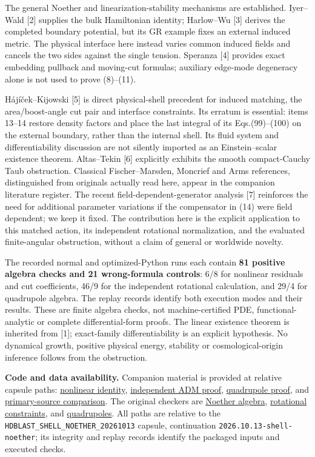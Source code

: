 \documentclass[
  10pt,
]{article}
\begin{document}
The general Noether and linearization-stability mechanisms are
established. Iyer--Wald {[}2{]} supplies the bulk Hamiltonian identity;
Harlow--Wu {[}3{]} derives the completed boundary potential, but its GR
example fixes an external induced metric. The physical interface here
instead varies common induced fields and cancels the two sides against
the single tension. Speranza {[}4{]} provides exact embedding pullback
and moving-cut formulas; auxiliary edge-mode degeneracy alone is not
used to prove (8)--(11).

Hájíček--Kijowski {[}5{]} is direct physical-shell precedent for induced
matching, the area/boost-angle cut pair and interface constraints. Its
erratum is essential: items 13--14 restore density factors and place the
last integral of its Eqs.(99)--(100) on the external boundary, rather
than the internal shell. Its fluid system and differentiability
discussion are not silently imported as an Einstein--scalar existence
theorem. Altas--Tekin {[}6{]} explicitly exhibits the smooth
compact-Cauchy Taub obstruction. Classical Fischer--Marsden, Moncrief
and Arms references, distinguished from originals actually read here,
appear in the companion literature register. The recent
field-dependent-generator analysis {[}7{]} reinforces the need for
additional parameter variations if the compensator in (14) were field
dependent; we keep it fixed. The contribution here is the explicit
application to this matched action, its independent rotational
normalization, and the evaluated finite-angular obstruction, without a
claim of general or worldwide novelty.

The recorded normal and optimized-Python runs each contain \textbf{81
positive algebra checks and 21 wrong-formula controls}: 6/8 for
nonlinear residuals and cut coefficients, 46/9 for the independent
rotational calculation, and 29/4 for quadrupole algebra. The replay
records identify both execution modes and their results. These are
finite algebra checks, not machine-certified PDE, functional-analytic or
complete differential-form proofs. The linear existence theorem is
inherited from {[}1{]}; exact-family differentiability is an explicit
hypothesis. No dynamical growth, positive physical energy, stability or
cosmological-origin inference follows from the obstruction.

\textbf{Code and data availability.} Companion material is provided at
relative capsule paths:
\href{../derivation/FULL_NONLINEAR_SHELL_NOETHER_IDENTITY.md}{nonlinear
identity},
\href{../independent/ROTATIONAL_SECOND_ORDER_SHELL_OBSTRUCTION.md}{independent
ADM proof}, \href{../root-audit/QUADRUPOLE_ADMISSIBILITY.md}{quadrupole
proof}, and
\href{../literature/NONLINEAR_SHELL_NOETHER_PRIOR_ART.md}{primary-source
comparison}. The original checkers are
\href{../derivation/check_nonlinear_shell_noether.py}{Noether algebra},
\href{../independent/check_rotational_constraints.py}{rotational
constraints}, and
\href{../root-audit/check_quadrupole_admissibility.py}{quadrupoles}. All
paths are relative to the \texttt{HDBLAST\_SHELL\_NOETHER\_20261013}
capsule, continuation \texttt{2026.10.13-shell-noether}; its integrity
and replay records identify the packaged inputs and executed checks.
\end{document}
